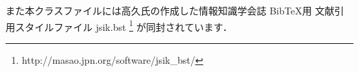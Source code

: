 \documentclass[12pt,a4paper,twocolumn,twoside]{jsik}
\begin{document}
また本クラスファイルには高久氏の作成した情報知識学会誌 BibTeX用
文献引用スタイルファイル jsik.bst
\footnote{http://masao.jpn.org/software/jsik\_bst/} が同封されています．





\end{document}
